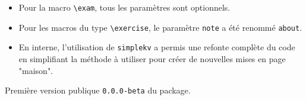 \documentclass[12pt,a4paper]{scrartcl}
\begin{document}
\begin{description}[leftmargin=1em]
\begin{itemize}
        \item Pour la macro \verb+\exam+, tous les paramètres sont optionnels.

        \item Pour les macros du type \verb+\exercise+, le paramètre \verb+note+ a été renommé \verb+about+.

        \item En interne, l'utilisation de \verb+simplekv+ a permis une refonte complète du code en simplifiant la méthode à utiliser pour créer de nouvelles mises en page "maison".
    \end{itemize}

    \item[2017-11-03] Première version publique \verb+0.0.0-beta+ du package.
\end{description}
\end{document}
